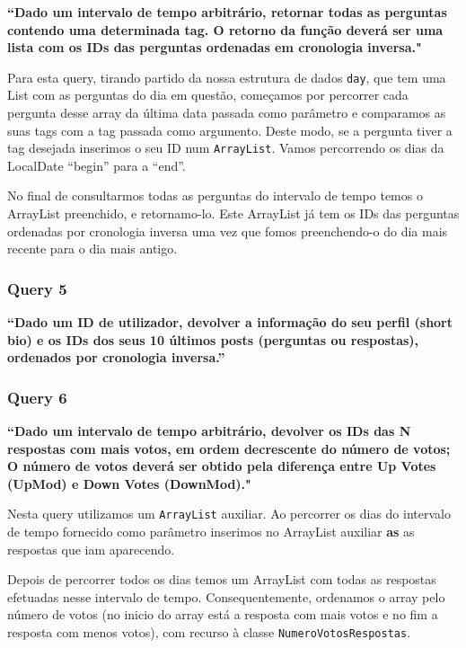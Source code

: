 \documentclass[a4paper]{article}
\begin{document}
\textbf{“Dado um intervalo de tempo arbitrário, retornar todas as perguntas contendo uma determinada tag.
O retorno da função deverá ser uma lista com os IDs das perguntas ordenadas em cronologia inversa."}

\vspace{0.1cm}

Para esta query, tirando partido da nossa estrutura de dados \texttt{day},
que tem uma \textsf{List} com as perguntas do dia em questão,
começamos por percorrer cada pergunta desse array
da última data passada como parâmetro e comparamos as suas tags com a tag passada como argumento.
Deste modo, se a pergunta tiver a tag desejada inserimos o seu ID num \texttt{ArrayList}.
Vamos percorrendo os dias da LocalDate “begin” para a “end”.

No final de consultarmos todas as perguntas do intervalo de tempo temos o
ArrayList preenchido, e retornamo-lo.
Este ArrayList já tem os IDs das perguntas ordenadas por cronologia inversa uma vez que
fomos preenchendo-o do dia mais recente para o dia mais antigo.



\subsubsection*{Query 5}
\label{sec:query5}

\textbf{“Dado um ID de utilizador,  devolver a informação do
seu perfil (short bio) e os IDs dos seus 10 últimos posts (perguntas ou respostas),
ordenados por cronologia inversa.”}

\vspace{0.1cm}


\subsubsection*{Query 6}
\label{sec:query6}

\textbf{“Dado um intervalo de tempo arbitrário, devolver os IDs das N respostas
com mais votos, em ordem decrescente do número de votos; O número de votos deverá
ser obtido pela diferença entre Up Votes (UpMod) e Down Votes (DownMod)."}

\vspace{0.1cm}

Nesta query utilizamos um \texttt{ArrayList} auxiliar. Ao percorrer os
dias do intervalo de tempo fornecido como parâmetro inserimos
no ArrayList auxiliar \textbf{as} as
respostas que iam aparecendo.

Depois de percorrer todos os dias temos um ArrayList com todas as respostas
efetuadas nesse intervalo de tempo. Consequentemente, ordenamos o array pelo número
de votos (no inicio do array está a resposta com mais votos e no fim a resposta
com menos votos), com recurso à classe \texttt{NumeroVotosRespostas}.
\end{document}
